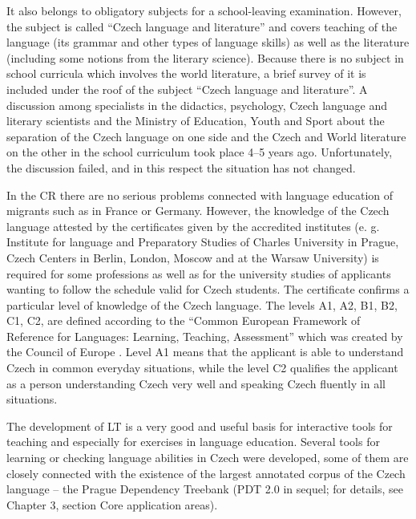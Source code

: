 \begin{multicols}{2}
 It also belongs to obligatory subjects for a school-leaving examination. However, the subject is called “Czech language and literature” and covers teaching of the language (its grammar and other types of language skills) as well as the literature (including some notions from the literary science).  Because there is no subject in school curricula which involves the world literature, a brief survey of it is included under the roof of the subject “Czech language and literature”. A discussion among specialists in the didactics, psychology, Czech language and literary scientists and the Ministry of Education, Youth and Sport about the separation of the Czech language on one side and the Czech and World literature on the other in the school curriculum took place 4--5 years ago. Unfortunately, the discussion failed, and in this respect the situation has not changed.

In the CR there are no serious problems connected with language education of migrants such as in France or Germany. However, the knowledge of the Czech language attested by the certificates given by the accredited institutes (e. g. Institute for language and Preparatory Studies of Charles University in Prague, Czech Centers in Berlin, London, Moscow and at the Warsaw University) is required for some professions as well as for the university studies of applicants wanting to follow the schedule valid for Czech students. The certificate confirms a particular level of knowledge of the Czech language.  The levels A1, A2, B1, B2, C1, C2, are defined according to the “Common European Framework of Reference for Languages: Learning, Teaching, Assessment” which was created by the Council of Europe \cite{Note7}. Level A1 means that the applicant is able to understand Czech in common everyday situations, while the level C2 qualifies the applicant as a person understanding Czech very well and speaking Czech fluently in all situations.

The development of LT is a very good and useful basis for interactive tools for teaching and especially for exercises in language education. Several tools for learning or checking language abilities in Czech were developed, some of them are closely connected with the existence of the largest annotated corpus of the Czech language -- the Prague Dependency Treebank (PDT 2.0 in sequel; for details, see Chapter 3, section Core application areas).


\end{multicols}
